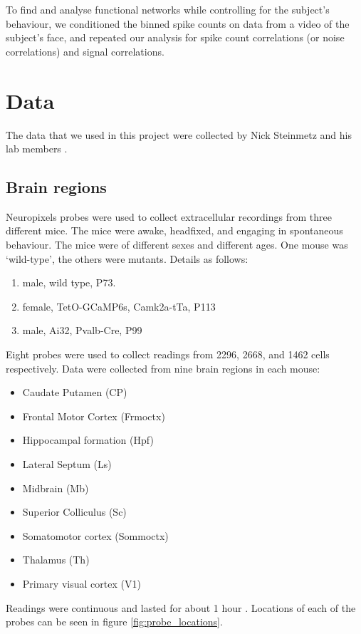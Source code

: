 To find and analyse functional networks while controlling for the subject's behaviour, we conditioned the binned spike counts on data from a video of the subject's face, and repeated our analysis for spike count correlations (or noise correlations) and signal correlations.

\section{Data}

    The data that we used in this project were collected by Nick Steinmetz and his lab members \parencite{stringer, steinmetz2019}.

    \subsection{Brain regions}
    Neuropixels probes were used to collect extracellular recordings  \parencite{jun} from three different mice. The mice were awake, headfixed, and engaging in spontaneous behaviour. The mice were of different sexes and different ages. One mouse was `wild-type', the others were mutants. Details as follows:
    \begin{enumerate}
        \item male, wild type, P73. %
        \item female, TetO-GCaMP6s, Camk2a-tTa, P113 %
        \item male, Ai32, Pvalb-Cre, P99 %
    \end{enumerate}

    Eight probes were used to collect readings from 2296, 2668, and 1462 cells respectively. Data were collected from nine brain regions in each mouse:
    \begin{itemize}
        \item Caudate Putamen (CP)
        \item Frontal Motor Cortex (Frmoctx)
        \item Hippocampal formation (Hpf)
        \item Lateral Septum (Ls)
        \item Midbrain (Mb)
        \item Superior Colliculus (Sc)
        \item Somatomotor cortex (Sommoctx)
        \item Thalamus (Th)
        \item Primary visual cortex (V1)
    \end{itemize}
    Readings were continuous and lasted for about 1 hour  \parencite{stringer, steinmetz2019}. Locations of each of the probes can be seen in figure \ref{fig:probe_locations}.

